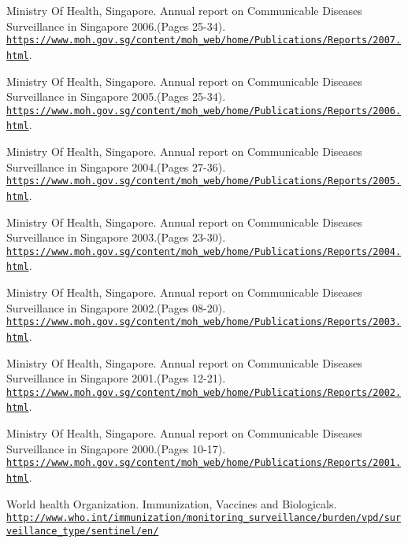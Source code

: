 \documentclass[11pt]{exam}
\begin{document}
\begin{thebibliography}{28}
Ministry Of Health, Singapore. Annual report on Communicable Diseases Surveillance in Singapore 2006.(Pages 25-34).
\\\texttt{\url{https://www.moh.gov.sg/content/moh_web/home/Publications/Reports/2007.html}}.

Ministry Of Health, Singapore. Annual report on Communicable Diseases Surveillance in Singapore 2005.(Pages 25-34).
\\\texttt{\url{https://www.moh.gov.sg/content/moh_web/home/Publications/Reports/2006.html}}.

Ministry Of Health, Singapore. Annual report on Communicable Diseases Surveillance in Singapore 2004.(Pages 27-36).
\\\texttt{\url{https://www.moh.gov.sg/content/moh_web/home/Publications/Reports/2005.html}}.

Ministry Of Health, Singapore. Annual report on Communicable Diseases Surveillance in Singapore 2003.(Pages 23-30).
\\\texttt{\url{https://www.moh.gov.sg/content/moh_web/home/Publications/Reports/2004.html}}.

Ministry Of Health, Singapore. Annual report on Communicable Diseases Surveillance in Singapore 2002.(Pages 08-20).
\\\texttt{\url{https://www.moh.gov.sg/content/moh_web/home/Publications/Reports/2003.html}}.

Ministry Of Health, Singapore. Annual report on Communicable Diseases Surveillance in Singapore 2001.(Pages 12-21).
\\\texttt{\url{https://www.moh.gov.sg/content/moh_web/home/Publications/Reports/2002.html}}.

Ministry Of Health, Singapore. Annual report on Communicable Diseases Surveillance in Singapore 2000.(Pages 10-17).
\\\texttt{\url{https://www.moh.gov.sg/content/moh_web/home/Publications/Reports/2001.html}}.

World health Organization. Immunization, Vaccines and Biologicals.
\\\texttt{\url{http://www.who.int/immunization/monitoring_surveillance/burden/vpd/surveillance_type/sentinel/en/}}


\end{thebibliography}
\end{document}
